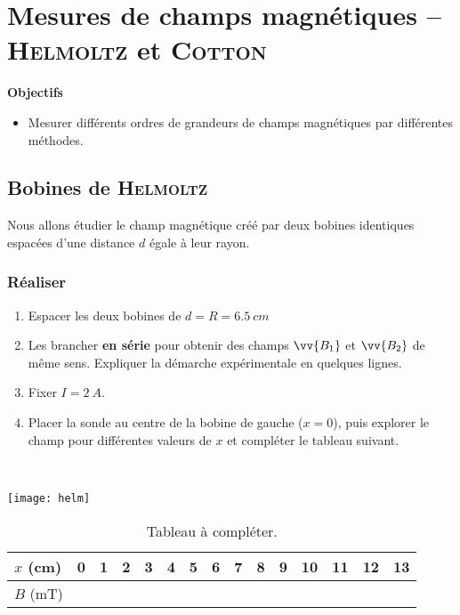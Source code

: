 \documentclass[a4paper, 11pt, final, garamond]{book}
\begin{document}
\setcounter{chapter}{30}

\chapter{Mesures de champs magnétiques -- \textsc{Helmoltz} et \textsc{Cotton}}
\begin{center}
  \Large
  \textbf{Objectifs}
\end{center}
\begin{itemize}[label=$\diamond$, leftmargin=10pt]
  \item Mesurer différents ordres de grandeurs de champs magnétiques par
    différentes méthodes.
\end{itemize}

\section{Bobines de \textsc{Helmoltz}}
\label{sec:helm}
\noindent
\begin{minipage}[t]{.45\linewidth}
  Nous allons étudier le champ magnétique créé par deux bobines identiques
  espacées d'une distance $d$ égale à leur rayon.
  \subsection{Réaliser}
  \label{ssec:helmreal}
  \begin{enumerate}
    \item Espacer les deux bobines de $d = R = \SI{6.5}{cm}$
    \item Les brancher \textbf{en série} pour obtenir des champs $\vv{B_1}$ et
      $\vv{B_2}$ de même sens.
    \sqitem[1] Expliquer la démarche expérimentale en quelques lignes.
    \item Fixer $I = \SI{2}{A}$.
    \item Placer la sonde au centre de la bobine de gauche ($x=0$), puis explorer
      le champ pour différentes valeurs de $x$ et compléter le tableau suivant.
  \end{enumerate}
\end{minipage}
\hfill
\begin{minipage}[t]{.45\linewidth}
  ~
  \begin{center}
    \texttt{[image: helm]}
    \label{fig:helm}
  \end{center}
\end{minipage}

\begin{table}[h]
  \caption{Tableau à compléter.}
  \label{tab:tofill}
  \centering
  \begin{tabularx}{\linewidth}{|l|Y*{13}{|Y}|}
    \hline
    $x$ (\si{cm}) &
    0 & 1 & 2 & 3 & 4 & 5 & 6 & 7 & 8 & 9 & 10 & 11 & 12 & 13
    \\\hline
    $B$ (\si{mT}) &
    & & & & & & & & & & & & &
    \\
    \hline
  \end{tabularx}
\end{table}
\end{document}
